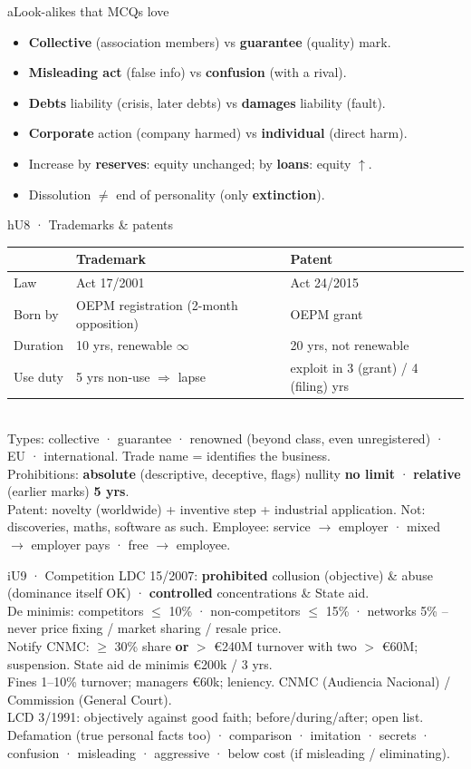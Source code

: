 \documentclass[9pt]{extarticle}
\newcommand{\col}[2]{\begin{minipage}[t]{#1\linewidth}\vspace{0pt}#2\end{minipage}}
\begin{document}
{\begin{bx}{a}{Look-alikes that MCQs love}
\begin{itemize}
\item \textbf{Collective} (association members) vs \textbf{guarantee} (quality) mark.
\item \textbf{Misleading act} (false info) vs \textbf{confusion} (with a rival).
\item \textbf{Debts} liability (crisis, later debts) vs \textbf{damages} liability (fault).
\item \textbf{Corporate} action (company harmed) vs \textbf{individual} (direct harm).
\item Increase by \textbf{reserves}: equity unchanged; by \textbf{loans}: equity $\uparrow$.
\item Dissolution $\neq$ end of personality (only \textbf{extinction}).
\end{itemize}
\end{bx}
}\hfill\col{0.49}{
\begin{bx}{h}{U8 · Trademarks \& patents}
\begin{tabularx}{\linewidth}{@{}l X X@{}}\toprule & \textbf{Trademark} & \textbf{Patent}\\\midrule
Law & Act 17/2001 & Act 24/2015\\ Born by & OEPM registration (2-month opposition) & OEPM grant\\ Duration & 10 yrs, renewable $\infty$ & 20 yrs, not renewable\\ Use duty & 5 yrs non-use $\Rightarrow$ lapse & exploit in 3 (grant) / 4 (filing) yrs\\\bottomrule\end{tabularx}\\[0.5mm]
Types: collective · guarantee · renowned (beyond class, even unregistered) · EU · international. Trade name = identifies the business.\\
Prohibitions: \textbf{absolute} (descriptive, deceptive, flags) nullity \textbf{no limit} · \textbf{relative} (earlier marks) \textbf{5 yrs}.\\
Patent: novelty (worldwide) + inventive step + industrial application. Not: discoveries, maths, software as such. Employee: service $\rightarrow$ employer · mixed $\rightarrow$ employer pays · free $\rightarrow$ employee.
\end{bx}
\begin{bx}{i}{U9 · Competition}
LDC 15/2007: \textbf{prohibited} collusion (objective) \& abuse (dominance itself OK) · \textbf{controlled} concentrations \& State aid.\\
De minimis: competitors $\leq$ 10\% · non-competitors $\leq$ 15\% · networks 5\% -- never price fixing / market sharing / resale price.\\
Notify CNMC: $\geq$ 30\% share \textbf{or} $>$ €240M turnover with two $>$ €60M; suspension. State aid de minimis €200k / 3 yrs.\\
Fines 1--10\% turnover; managers €60k; leniency. CNMC (Audiencia Nacional) / Commission (General Court).\\
LCD 3/1991: objectively against good faith; before/during/after; open list. Defamation (true personal facts too) · comparison · imitation · secrets · confusion · misleading · aggressive · below cost (if misleading / eliminating).
\end{bx}
}
\end{document}

